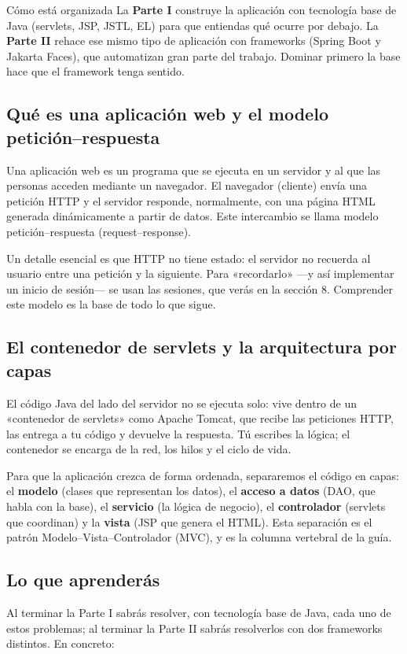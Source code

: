 \documentclass[11pt]{article}
\begin{document}
\begin{cajatip}{Cómo está organizada}
La \textbf{Parte I} construye la aplicación con tecnología base de Java (servlets, JSP, JSTL, EL) para que entiendas qué ocurre por debajo. La \textbf{Parte II} rehace ese mismo tipo de aplicación con frameworks (Spring Boot y Jakarta Faces), que automatizan gran parte del trabajo. Dominar primero la base hace que el framework tenga sentido.\par
\end{cajatip}
\subsection{Qué es una aplicación web y el modelo petición–respuesta}
Una aplicación web es un programa que se ejecuta en un servidor y al que las personas acceden mediante un navegador. El navegador (cliente) envía una petición HTTP y el servidor responde, normalmente, con una página HTML generada dinámicamente a partir de datos. Este intercambio se llama modelo petición–respuesta (request–response).

Un detalle esencial es que HTTP no tiene estado: el servidor no recuerda al usuario entre una petición y la siguiente. Para «recordarlo» —y así implementar un inicio de sesión— se usan las sesiones, que verás en la sección 8. Comprender este modelo es la base de todo lo que sigue.

\subsection{El contenedor de servlets y la arquitectura por capas}
El código Java del lado del servidor no se ejecuta solo: vive dentro de un «contenedor de servlets» como Apache Tomcat, que recibe las peticiones HTTP, las entrega a tu código y devuelve la respuesta. Tú escribes la lógica; el contenedor se encarga de la red, los hilos y el ciclo de vida.

Para que la aplicación crezca de forma ordenada, separaremos el código en capas: el \textbf{modelo} (clases que representan los datos), el \textbf{acceso a datos} (DAO, que habla con la base), el \textbf{servicio} (la lógica de negocio), el \textbf{controlador} (servlets que coordinan) y la \textbf{vista} (JSP que genera el HTML). Esta separación es el patrón Modelo–Vista–Controlador (MVC), y es la columna vertebral de la guía.

\subsection{Lo que aprenderás}
Al terminar la Parte I sabrás resolver, con tecnología base de Java, cada uno de estos problemas; al terminar la Parte II sabrás resolverlos con dos frameworks distintos. En concreto:
\end{document}
